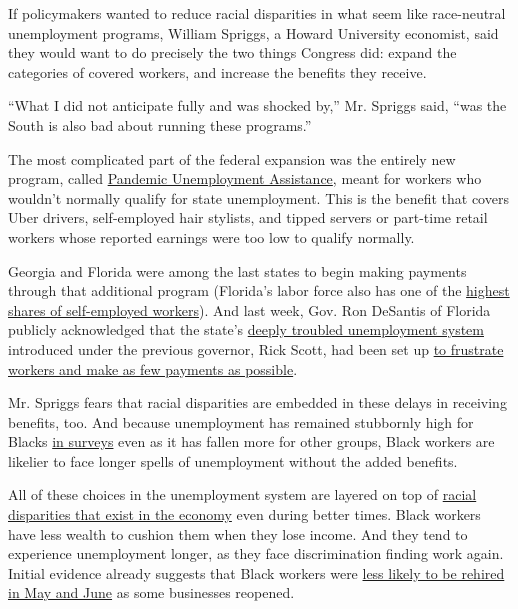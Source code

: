 If policymakers wanted to reduce racial disparities in what seem like
race-neutral unemployment programs, William Spriggs, a Howard University
economist, said they would want to do precisely the two things Congress
did: expand the categories of covered workers, and increase the benefits
they receive.

``What I did not anticipate fully and was shocked by,'' Mr. Spriggs
said, ``was the South is also bad about running these programs.''

The most complicated part of the federal expansion was the entirely new
program, called
\href{https://www.dol.gov/coronavirus/unemployment-insurance\#:~:text=The\%20new\%20law\%20creates\%20the,)\%2C\%20PEUC\%2C\%20PUA\%2C\%20Extended}{Pandemic
Unemployment Assistance}, meant for workers who wouldn't normally
qualify for state unemployment. This is the benefit that covers Uber
drivers, self-employed hair stylists, and tipped servers or part-time
retail workers whose reported earnings were too low to qualify normally.

Georgia and Florida were among the last states to begin making payments
through that additional program (Florida's labor force also has one of
the
\href{https://bfi.uchicago.edu/wp-content/uploads/BFI_White-Paper_Koustas_4.2020.pdf}{highest
shares of self-employed workers}). And last week, Gov. Ron DeSantis of
Florida publicly acknowledged that the state's
\href{https://www.nytimes.com/2020/04/23/us/florida-coronavirus-unemployment.html}{deeply
troubled unemployment system} introduced under the previous governor,
Rick Scott, had been set up
\href{https://miami.cbslocal.com/2020/08/04/exclusive-governor-ron-desantis-acknowledges-florida-unemployment-system-designed-frustrate/}{to
frustrate workers and make as few payments as possible}.

Mr. Spriggs fears that racial disparities are embedded in these delays
in receiving benefits, too. And because unemployment has remained
stubbornly high for Blacks
\href{https://www.nytimes.com/interactive/2020/05/13/upshot/coronavirus-america-job-losses-slowing-tracker.html}{in
surveys} even as it has fallen more for other groups, Black workers are
likelier to face longer spells of unemployment without the added
benefits.

All of these choices in the unemployment system are layered on top of
\href{https://www.nytimes.com/2020/06/01/business/economy/black-workers-inequality-economic-risks.html}{racial
disparities that exist in the economy} even during better times. Black
workers have less wealth to cushion them when they lose income. And they
tend to experience unemployment longer, as they face discrimination
finding work again. Initial evidence already suggests that Black workers
were
\href{https://eml.berkeley.edu/~jrothst/workingpapers/bartik_bertrand_etal_july212020.pdf}{less
likely to be rehired in May and June} as some businesses reopened.

